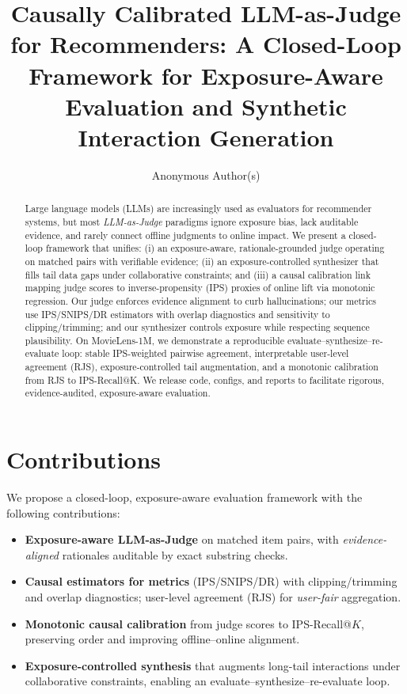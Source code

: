 \documentclass[sigconf,anonymous,review]{acmart}
\title{Causally Calibrated LLM-as-Judge for Recommenders: A Closed-Loop Framework for Exposure-Aware Evaluation and Synthetic Interaction Generation}
\author{Anonymous Author(s)}
\affiliation{\institution{Anonymous Submission} \country{}}
\date{}
\begin{document}
\section*{Contributions}
We propose a closed-loop, exposure-aware evaluation framework with the following contributions:
\begin{itemize}
  \item \textbf{Exposure-aware LLM-as-Judge} on matched item pairs, with \emph{evidence-aligned} rationales auditable by exact substring checks.
  \item \textbf{Causal estimators for metrics} (IPS/SNIPS/DR) with clipping/trimming and overlap diagnostics; user-level agreement (RJS) for \emph{user-fair} aggregation.
  \item \textbf{Monotonic causal calibration} from judge scores to IPS-Recall@\(K\), preserving order and improving offline--online alignment.
  \item \textbf{Exposure-controlled synthesis} that augments long-tail interactions under collaborative constraints, enabling an evaluate--synthesize--re-evaluate loop.
\end{itemize}

\begin{abstract}
Large language models (LLMs) are increasingly used as evaluators for recommender systems, but most \emph{LLM-as-Judge} paradigms ignore exposure bias, lack auditable evidence, and rarely connect offline judgments to online impact. We present a closed-loop framework that unifies: (i) an exposure-aware, rationale-grounded judge operating on matched pairs with verifiable evidence; (ii) an exposure-controlled synthesizer that fills tail data gaps under collaborative constraints; and (iii) a causal calibration link mapping judge scores to inverse-propensity (IPS) proxies of online lift via monotonic regression. Our judge enforces evidence alignment to curb hallucinations; our metrics use IPS/SNIPS/DR estimators with overlap diagnostics and sensitivity to clipping/trimming; and our synthesizer controls exposure while respecting sequence plausibility. On MovieLens-1M, we demonstrate a reproducible evaluate–synthesize–re-evaluate loop: stable IPS-weighted pairwise agreement, interpretable user-level agreement (RJS), exposure-controlled tail augmentation, and a monotonic calibration from RJS to IPS-Recall@K. We release code, configs, and reports to facilitate rigorous, evidence-audited, exposure-aware evaluation.
\end{abstract}

\end{document}
